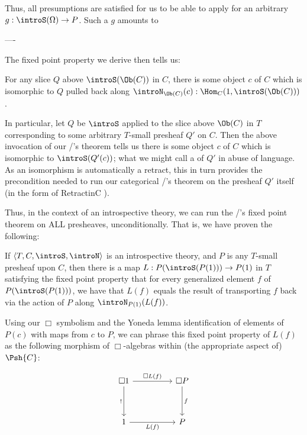 Thus, all presumptions are satisfied for us to be able to apply  for an arbitrary $g : \introS(\Omega) \to P$. Such a $g$ amounts to \TODO

----


The fixed point property we derive then tells us:

\begin{theorem}\label{ObjectToSetFixedPoint}
For any slice $Q$ above $\introS(\Ob(C))$ in $C$, there is some object $c$ of $C$ which is isomorphic to $Q$ pulled back along $\introN_{\Ob(C)}(c) : \Hom_C(1, \introS(\Ob(C)))$.
\end{theorem}

In particular, let $Q$ be $\introS$ applied to the slice above $\Ob(C)$ in $T$ corresponding to some arbitrary $T$-small presheaf $Q'$ on $C$. Then the above invocation of our \Loeb/'s theorem tells us there is some object $c$ of $C$ which is isomorphic to $\introS(Q'(c))$; what we might call a  of $Q'$ in abuse of language. As an isomorphism is automatically a retract, this in turn provides the precondition needed to run our categorical \Loeb/'s theorem on the presheaf $Q'$ itself (in the form of RetractinC \TODO).

Thus, in the context of an introspective theory, we can run the \Loeb/'s fixed point theorem on ALL presheaves, unconditionally. That is, we have proven the following:

\label{LoebInIntrosp}
If $\langle T, C, \introS, \introN \rangle$ is an introspective theory, and $P$ is any $T$-small presheaf upon $C$, then there is a map $L : P(\introS(P(1))) \to P(1)$ in $T$ satisfying the fixed point property that for every generalized element $f$ of $P(\introS(P(1)))$, we have that $L(f)$ equals the result of transporting $f$ back via the action of $P$ along $\introN_{P(1)}(L(f))$.

Using our $\Box$ symbolism and the Yoneda lemma identification of elements of $P(c)$ with maps from $c$ to $P$, we can phrase this fixed point property of $L(f)$ as the following morphism of $\Box$-algebras within (the appropriate aspect of) $\Psh{C}$:

\[\begin{tikzcd}
	{\Box 1} && {\Box P} \\
	\\
	1 && P
	\arrow["f", from=1-3, to=3-3]
	\arrow["{!}"', from=1-1, to=3-1]
	\arrow["{\Box L(f)}", from=1-1, to=1-3]
	\arrow["{L(f)}"', from=3-1, to=3-3]
\end{tikzcd}\]

